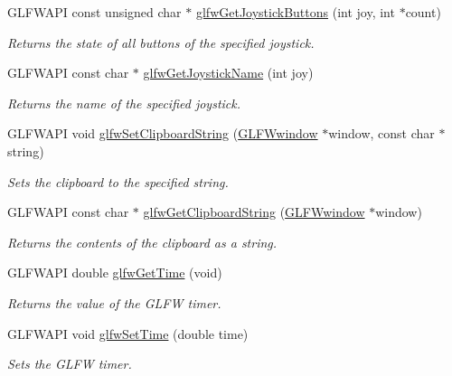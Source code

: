 \begin{DoxyCompactItemize}
G\+L\+F\+W\+A\+P\+I const unsigned char $\ast$ \hyperlink{group__input_ga3951bea72b5fb4870b1aa0e5c2e9c903}{glfw\+Get\+Joystick\+Buttons} (int joy, int $\ast$count)
\begin{DoxyCompactList}\small\item\em Returns the state of all buttons of the specified joystick. \end{DoxyCompactList}\item 
G\+L\+F\+W\+A\+P\+I const char $\ast$ \hyperlink{group__input_gac50a4fd9b01886cf9fa2c45f19191fb8}{glfw\+Get\+Joystick\+Name} (int joy)
\begin{DoxyCompactList}\small\item\em Returns the name of the specified joystick. \end{DoxyCompactList}\item 
G\+L\+F\+W\+A\+P\+I void \hyperlink{group__input_ga7a580309bbc185a0459c3559021d2fd7}{glfw\+Set\+Clipboard\+String} (\hyperlink{group__window_ga3c96d80d363e67d13a41b5d1821f3242}{G\+L\+F\+Wwindow} $\ast$window, const char $\ast$string)
\begin{DoxyCompactList}\small\item\em Sets the clipboard to the specified string. \end{DoxyCompactList}\item 
G\+L\+F\+W\+A\+P\+I const char $\ast$ \hyperlink{group__input_ga3ac90c8bbaf0b46063bb02b574f3b6f7}{glfw\+Get\+Clipboard\+String} (\hyperlink{group__window_ga3c96d80d363e67d13a41b5d1821f3242}{G\+L\+F\+Wwindow} $\ast$window)
\begin{DoxyCompactList}\small\item\em Returns the contents of the clipboard as a string. \end{DoxyCompactList}\item 
G\+L\+F\+W\+A\+P\+I double \hyperlink{group__input_ga03d4a1039b8662c71eeb40beea8cb622}{glfw\+Get\+Time} (void)
\begin{DoxyCompactList}\small\item\em Returns the value of the G\+L\+F\+W timer. \end{DoxyCompactList}\item 
G\+L\+F\+W\+A\+P\+I void \hyperlink{group__input_ga94360a3628a09f32708f83cc3fa48590}{glfw\+Set\+Time} (double time)
\begin{DoxyCompactList}\small\item\em Sets the G\+L\+F\+W timer. \end{DoxyCompactList}\end{DoxyCompactItemize}
